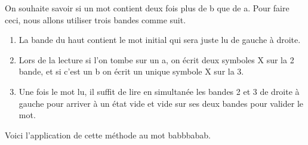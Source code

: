 On souhaite savoir si un mot contient deux fois plus de b que de a. Pour faire ceci, nous allons utiliser trois bandes comme suit.
\begin{enumerate}
	\item La bande du haut contient le mot initial qui sera juste lu de gauche à droite.

	\item Lors de la lecture si l'on tombe sur un a, on écrit deux symboles X sur la 2\ieme{} bande, et si c'est un b on écrit un unique symbole X sur la 3\ieme{}.

	\item Une fois le mot lu, il suffit de lire en simultanée les bandes 2 et 3 de droite à gauche pour arriver à un état vide et vide sur ses deux bandes pour valider le mot.
\end{enumerate}

Voici l'application de cette méthode au mot babbbabab.


\medskip %

\phantom{\emptybox\emptybox}%
	\deah

\nemptybox\nemptybox%
\nemptybox\nemptybox

\phantom{\emptybox\emptybox}%
	\deah

\emptybox\emptybox%
	\emptybox\emptybox\emptybox\emptybox\emptybox\emptybox\emptybox\emptybox\emptybox%
\emptybox\emptybox

\phantom{\emptybox\emptybox}%
	\deah

\emptybox\emptybox%
	\emptybox\emptybox\emptybox\emptybox\emptybox\emptybox\emptybox\emptybox\emptybox%
\emptybox\emptybox



\bigskip %

\phantom{\emptybox\emptybox\emptybox}%
	\deah

\nemptybox\nemptybox%
\nemptybox\nemptybox

\phantom{\emptybox\emptybox}%
	\deah

\emptybox\emptybox%
	\emptybox\emptybox\emptybox\emptybox\emptybox\emptybox\emptybox\emptybox\emptybox%
\emptybox\emptybox

\phantom{\emptybox\emptybox\emptybox}%
	\deah

\emptybox\emptybox%
	\emptybox\emptybox\emptybox\emptybox\emptybox\emptybox\emptybox\emptybox%
\emptybox\emptybox



